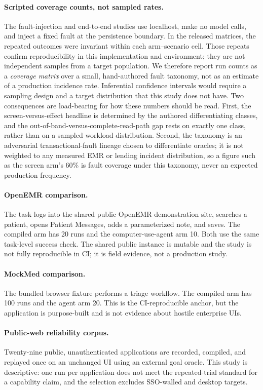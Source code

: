 \paragraph{Scripted coverage counts, not sampled rates.}
The fault-injection and end-to-end studies use localhost, make no model calls,
and inject a fixed fault at the persistence boundary. In the released matrices,
the repeated outcomes were invariant within each arm--scenario cell. Those
repeats confirm reproducibility in this implementation and environment; they are
not independent samples from a target population. We therefore report run
counts as a \emph{coverage matrix} over a small, hand-authored fault taxonomy,
not as an estimate of a production incidence rate. Inferential confidence
intervals would require a sampling design and a target distribution that this
study does not have. Two consequences are load-bearing for how these numbers
should be read. First, the screen-versus-effect headline is determined by the
authored differentiating classes, and the out-of-band-versus-complete-read-path
gap rests on exactly one class, rather than on a sampled workload distribution.
Second, the taxonomy is an adversarial transactional-fault lineage
\cite{gray1981transaction} chosen to differentiate oracles; it is not weighted
to any measured EMR or lending incident distribution, so a figure such as the
screen arm's 60\% is fault coverage under this taxonomy, never an expected
production frequency.

\paragraph{OpenEMR comparison.}
The task logs into the shared public OpenEMR demonstration site, searches a
patient, opens Patient Messages, adds a parameterized note, and saves. The
compiled arm has 20 runs and the computer-use-agent arm 10. Both use the same
task-level success check. The shared public instance is mutable and the study is
not fully reproducible in CI; it is field evidence, not a production study.

\paragraph{MockMed comparison.}
The bundled browser fixture performs a triage workflow. The compiled arm has
100 runs and the agent arm 20. This is the CI-reproducible anchor, but the
application is purpose-built and is not evidence about hostile enterprise UIs.

\paragraph{Public-web reliability corpus.}
Twenty-nine public, unauthenticated applications are recorded, compiled, and
replayed once on an unchanged UI using an external goal oracle. This study is
descriptive: one run per application does not meet the repeated-trial standard
for a capability claim, and the selection excludes SSO-walled and desktop
targets.

